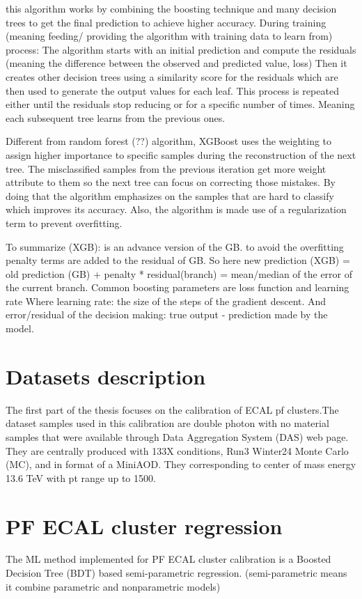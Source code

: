 this algorithm works by combining the boosting technique and many decision trees to get the final prediction to achieve higher accuracy.
During training (meaning feeding/ providing the algorithm with training data to learn from) process: The algorithm starts with an initial prediction and compute the residuals (meaning the difference between the observed and predicted value, loss) Then it creates other decision trees using a similarity score for the residuals %
which are then used to generate the output values for each leaf.  This process is repeated either until the residuals stop reducing or for a specific number of times. Meaning each subsequent tree learns from the previous ones.

Different from random forest (??) algorithm, XGBoost uses the weighting to assign higher importance to specific samples during the reconstruction of the next tree. The misclassified samples from the previous iteration get more weight attribute to them so the next tree can focus on correcting those mistakes. By doing that the algorithm emphasizes on the samples that are hard to classify which improves its accuracy.  Also, the algorithm is made use of a regularization term to prevent overfitting.

To summarize (XGB): is an advance version of the GB. to avoid the overfitting penalty terms are added to the residual of GB. So here new prediction (XGB) = old prediction (GB) + penalty * residual(branch) = mean/median of the error of the current branch. Common boosting parameters are loss function and learning rate Where learning rate: the size of the steps of the gradient descent. And error/residual of the decision making: true output - prediction made by the model. 

\section{Datasets description}

The first part of the thesis focuses on the calibration of ECAL pf clusters.The dataset samples used in this calibration are double photon with no material samples that were available through Data Aggregation System (DAS) web page.   
They are centrally produced with 133X %
conditions, Run3 Winter24 Monte Carlo (MC), and in format of a MiniAOD. They corresponding to center of mass energy 13.6 TeV with pt range up to 1500.  


\section{PF ECAL cluster regression}
The ML method implemented for PF ECAL cluster calibration is a Boosted Decision Tree (BDT) based semi-parametric regression. (semi-parametric means it combine parametric and nonparametric models) %

